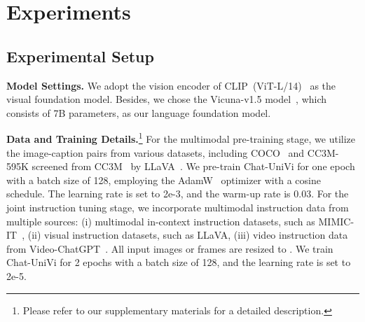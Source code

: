 \documentclass[10pt,twocolumn,letterpaper]{article}
\newcommand{\myparagraph}[1]{\textbf{#1}\hspace{1.8ex}}
\begin{document}
\section{Experiments}
\subsection{Experimental Setup}\label{Experimental Setup0}
\noindent  \myparagraph{Model Settings.} We adopt the vision encoder of CLIP~(ViT-L/14)~\cite{radford2021learning} as the visual foundation model. Besides, we chose the Vicuna-v1.5 model~\cite{vicuna}, which consists of 7B parameters, as our language foundation model.

\noindent \myparagraph{Data and Training Details.}\footnote{Please refer to our supplementary materials for a detailed description.} For the multimodal pre-training stage, we utilize the image-caption pairs from various datasets, including COCO~\cite{chen2015microsoft} and CC3M-595K screened from CC3M~\cite{sharma2018conceptual} by LLaVA~\cite{liu2023visual}. We pre-train Chat-UniVi for one epoch with a batch size of 128, employing the AdamW~\cite{kingma2014adam,loshchilov2017decoupled} optimizer with a cosine schedule. The learning rate is set to 2e-3, and the warm-up rate is 0.03. For the joint instruction tuning stage, we incorporate multimodal instruction data from multiple sources: (i) multimodal in-context instruction datasets, such as MIMIC-IT~\cite{li2023otter,antol2015vqa,hudson2019gqa}, (ii) visual instruction datasets, such as LLaVA, (iii) video instruction data from Video-ChatGPT~\cite{maaz2023video}. All input images or frames are resized to . We train Chat-UniVi for 2 epochs with a batch size of 128, and the learning rate is set to 2e-5.
\end{document}
